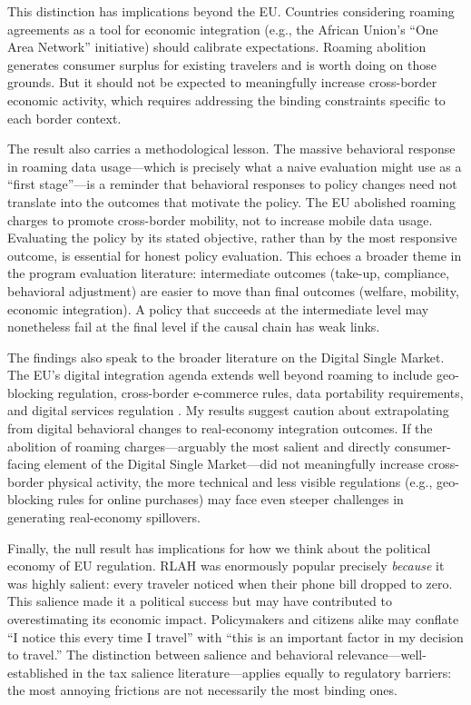 \documentclass[12pt]{article}
\begin{document}
This distinction has implications beyond the EU. Countries considering roaming agreements as a tool for economic integration (e.g., the African Union's ``One Area Network'' initiative) should calibrate expectations. Roaming abolition generates consumer surplus for existing travelers and is worth doing on those grounds. But it should not be expected to meaningfully increase cross-border economic activity, which requires addressing the binding constraints specific to each border context.

The result also carries a methodological lesson. The massive behavioral response in roaming data usage---which is precisely what a naive evaluation might use as a ``first stage''---is a reminder that behavioral responses to policy changes need not translate into the outcomes that motivate the policy. The EU abolished roaming charges to promote cross-border mobility, not to increase mobile data usage. Evaluating the policy by its stated objective, rather than by the most responsive outcome, is essential for honest policy evaluation. This echoes a broader theme in the program evaluation literature: intermediate outcomes (take-up, compliance, behavioral adjustment) are easier to move than final outcomes (welfare, mobility, economic integration). A policy that succeeds at the intermediate level may nonetheless fail at the final level if the causal chain has weak links.

The findings also speak to the broader literature on the Digital Single Market. The EU's digital integration agenda extends well beyond roaming to include geo-blocking regulation, cross-border e-commerce rules, data portability requirements, and digital services regulation \citep{cardona2020}. My results suggest caution about extrapolating from digital behavioral changes to real-economy integration outcomes. If the abolition of roaming charges---arguably the most salient and directly consumer-facing element of the Digital Single Market---did not meaningfully increase cross-border physical activity, the more technical and less visible regulations (e.g., geo-blocking rules for online purchases) may face even steeper challenges in generating real-economy spillovers.

Finally, the null result has implications for how we think about the political economy of EU regulation. RLAH was enormously popular precisely \textit{because} it was highly salient: every traveler noticed when their phone bill dropped to zero. This salience made it a political success but may have contributed to overestimating its economic impact. Policymakers and citizens alike may conflate ``I notice this every time I travel'' with ``this is an important factor in my decision to travel.'' The distinction between salience and behavioral relevance---well-established in the tax salience literature---applies equally to regulatory barriers: the most annoying frictions are not necessarily the most binding ones.
\end{document}
